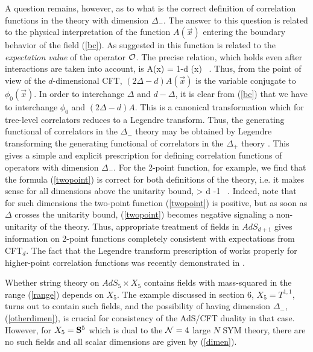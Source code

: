 \documentclass[12pt]{article}
\begin{document}
A question remains, however, as to what is the correct definition
of correlation functions in the theory with dimension $\Delta_-$.
The answer to this question is related to the physical interpretation
of the function $A(\vec x)$ entering the boundary behavior of the
field (\ref{bc}). As suggested in \cite{BKL} this function is related
to the {\it expectation value} of the operator ${\cal O}$.
The precise relation, which holds even after interactions are taken into
account, is \cite{KWnew}
\be
A(\vec x) = {1\Delta -d}  (\vec x) \rangle
\ .
\ee
Thus, from the point of view of the $d$-dimensional
CFT, $(2\Delta - d) A(\vec x)$
is the variable conjugate to $\phi_0(\vec x)$.
In order to interchange $\Delta$ and $d-\Delta$, it is clear from
(\ref{bc}) that we have to interchange $\phi_0$ and $(2\Delta - d) A$. 
This is a canonical transformation which for tree-level correlators
reduces to a Legendre transform. Thus, the generating functional of
correlators in the $\Delta_-$ theory may be obtained by Legendre
transforming the generating functional of correlators in the $\Delta_+$
theory \cite{KWnew}. This gives a simple and explicit prescription for defining
correlation functions of operators with dimension
$\Delta_-$. For the 2-point function, for example, we find 
that the formula (\ref{twopoint})
is correct for both definitions of the theory, i.e. it makes sense
for all dimensions above the unitarity bound,
\be
\Delta > {d} -1
\ .
\ee
Indeed, note that for such dimensions 
the two-point function (\ref{twopoint}) is positive,
but as soon as $\Delta$ crosses the unitarity bound,
(\ref{twopoint})
becomes negative signaling a non-unitarity of the theory.
Thus, appropriate treatment of fields in $AdS_{d+1}$ gives information
on 2-point functions completely consistent with expectations from 
CFT$_d$. The fact that the Legendre transform prescription of
\cite{KWnew} works properly for higher-point correlation functions
was recently demonstrated in \cite{MW}.



Whether string theory on $AdS_5 \times X_5$ contains fields with 
mass-squared
in the range (\ref{range}) depends on $X_5$. The example discussed
in section 6, $X_5=T^{1,1}$, turns out to contain such fields, and the
possibility of having dimension $\Delta_-$, (\ref{otherdimen}), 
is crucial for 
consistency of the AdS/CFT duality in that case. However, 
for $X_5={\bf S}^5$ which is dual
to the ${\cal N}=4$ large $N$ SYM theory, there are no such fields
and all scalar dimensions are given by (\ref{dimen}).
\end{document}
